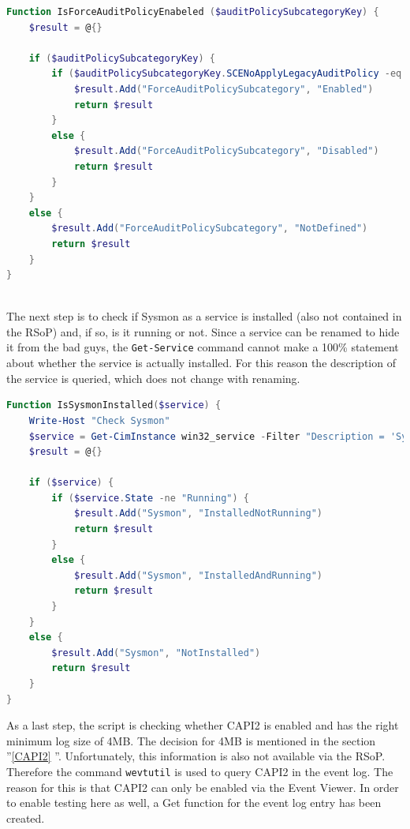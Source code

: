 \begin{lstlisting}[caption=Function IsForceAuditPolicyEnabeled, language=PowerShell]
Function IsForceAuditPolicyEnabeled ($auditPolicySubcategoryKey) {
    $result = @{}

    if ($auditPolicySubcategoryKey) {
        if ($auditPolicySubcategoryKey.SCENoApplyLegacyAuditPolicy -eq 1) {
            $result.Add("ForceAuditPolicySubcategory", "Enabled")
            return $result
        }
        else {
            $result.Add("ForceAuditPolicySubcategory", "Disabled")
            return $result
        }
    }
    else {
        $result.Add("ForceAuditPolicySubcategory", "NotDefined")
        return $result
    }
}
\end{lstlisting}\ \\
The next step is to check if Sysmon as a service is installed (also not contained in the RSoP) and, if so, is it running or not. Since a service can be renamed to hide it from the bad guys, the \lstinline|Get-Service| command cannot make a 100\% statement about whether the service is actually installed. For this reason the description of the service is queried, which does not change with renaming. \cite{Sysmon1}
\begin{lstlisting}[caption=Function IsSysmonInstalled, language=PowerShell]
Function IsSysmonInstalled($service) {
    Write-Host "Check Sysmon"
    $service = Get-CimInstance win32_service -Filter "Description = 'System Monitor service'"
    $result = @{}

    if ($service) {
        if ($service.State -ne "Running") {
            $result.Add("Sysmon", "InstalledNotRunning")
            return $result
        }
        else {
            $result.Add("Sysmon", "InstalledAndRunning")
            return $result
        }
    }
    else {
        $result.Add("Sysmon", "NotInstalled")
        return $result
    }
}
\end{lstlisting}

\clearpage

As a last step, the script is checking whether CAPI2 is enabled and has the right minimum log size of 4MB. The decision for 4MB is mentioned in the section ''\ref{CAPI2} ''. Unfortunately, this information is also not available via the RSoP. Therefore the command \lstinline|wevtutil| is used to query CAPI2 in the event log. The reason for this is that CAPI2 can only be enabled via the Event Viewer. \cite{CAPI2} In order to enable testing here as well, a Get function for the event log entry has been created.

